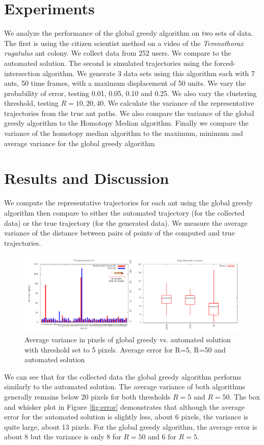 \documentclass[12pt]{article}
\begin{document}
\section{Experiments}
We analyze the performance of the global greedy algorithm on two sets of data. The first is using the citizen scientist method on a video of the {\it Temnothorax rugatulus} ant colony. We collect data from 252 users. We compare to the automated solution. The second is simulated trajectories using the forced-intersection algorithm. We generate 3 data sets using this algorithm each with 7 ants, 50 time frames, with a maximum displacement of 50 units. We vary the probability of error, testing 0.01, 0.05, 0.10 and 0.25. We also vary the clustering threshold, testing $R=10,20,40$. We calculate the variance of the representative trajectories from the true ant paths. We also compare the variance of the global greedy algorithm to the Homotopy Median algorithm. Finally we compare the variance of the homotopy median algorithm to the maximum, minimum and average variance for the global greedy algorithm

\section{Results and Discussion}
We compute the representative trajectories for each ant using the global greedy algorithm then compare to either the automated trajectory (for the collected data) or the true trajectory (for the generated data). We measure the average variance of the distance between pairs of points of the computed and true trajectories. \\

\begin{figure}[h!]
\centering
\includegraphics[width=7in]{range5Div.png}
\caption{Average variance in pixels of global greedy vs. automated solution with threshold set to 5 pixels. Average error for R=5, R=50 and automated solution}
\label{fig:real}
\end{figure}

We can see that for the collected data the global greedy algorithm performs similarly to the automated solution. The average variance of both algorithms generally remains below 20 pixels for both thresholds $R=5$ and $R=50$. The box and whisker plot in Figure \ref{fig:error} demonstrates that although the average error for the automated solution is slightly less, about 6 pixels, the variance is quite large, about 13 pixels. For the global greedy algorithm, the average error is about 8 but the variance is only 8 for $R=50$ and 6 for $R=5$.
\end{document}
